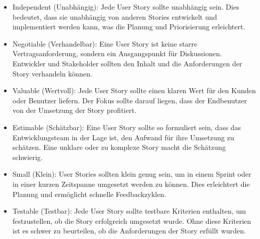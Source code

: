 \documentclass[main.tex]{subfiles}
\begin{document}
\begin{itemize}
    \item Independent (Unabhängig): Jede User Story sollte unabhängig sein. Dies bedeutet, dass sie unabhängig von anderen Stories entwickelt und implementiert werden kann, was die Planung und Priorisierung erleichtert.
    \item Negotiable (Verhandelbar): Eine User Story ist keine starre Vertragsanforderung, sondern ein Ausgangspunkt für Diskussionen. Entwickler und Stakeholder sollten den Inhalt und die Anforderungen der Story verhandeln können.
    \item Valuable (Wertvoll): Jede User Story sollte einen klaren Wert für den Kunden oder Benutzer liefern. Der Fokus sollte darauf liegen, dass der Endbenutzer von der Umsetzung der Story profitiert.
    \item Estimable (Schätzbar): Eine User Story sollte so formuliert sein, dass das Entwicklungsteam in der Lage ist, den Aufwand für ihre Umsetzung zu schätzen. Eine unklare oder zu komplexe Story macht die Schätzung schwierig.
    \item Small (Klein): User Stories sollten klein genug sein, um in einem Sprint oder in einer kurzen Zeitspanne umgesetzt werden zu können. Dies erleichtert die Planung und ermöglicht schnelle Feedbackzyklen.
    \item Testable (Testbar): Jede User Story sollte testbare Kriterien enthalten, um festzustellen, ob die Story erfolgreich umgesetzt wurde. Ohne diese Kriterien ist es schwer zu beurteilen, ob die Anforderungen der Story erfüllt wurden.
\end{itemize}
\end{document}
